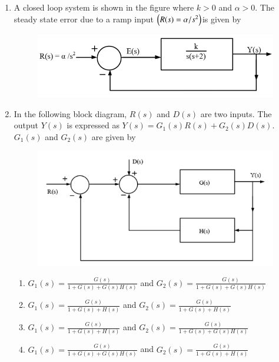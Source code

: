 \documentclass[a4paper, 11pt]{article}
\begin{document}
\begin{enumerate}
    \hfill{}
    
    \item A closed loop system is shown in the figure where $k>0$ and $\alpha>0$. The steady state error due to a ramp input $\left(R(s)=\alpha/s^2\right) $is given by
    \begin{figure}[H]
        \centering
        \includegraphics[width=0.6\columnwidth]{figs/Q31.png}
        \caption*{}
        \label{fig:q41}
    \end{figure}
    \begin{enumerate}
    \end{enumerate}

    \hfill{}
    
    \item In the following block diagram, $R(s)$ and $D(s)$ are two inputs. The output $Y(s)$ is expressed as $Y(s) = G_1(s)R(s) + G_2(s)D(s)$. $G_1(s)$ and $G_2(s)$ are given by
    \begin{figure}[H]
        \centering
        \includegraphics[width=0.6\columnwidth]{figs/Q32.png}
        \caption*{}
        \label{fig:q42}
    \end{figure}
    
    \begin{enumerate}
        \item $G_1(s) = \frac{G(s)}{1+G(s)+G(s)H(s)}$ and $G_2(s) = \frac{G(s)}{1+G(s)+G(s)H(s)}$
        \item $G_1(s) = \frac{G(s)}{1+G(s)+H(s)}$ and $G_2(s) = \frac{G(s)}{1+G(s)+H(s)}$
        \item $G_1(s) = \frac{G(s)}{1+G(s)+H(s)}$ and $G_2(s) = \frac{G(s)}{1+G(s)+G(s)H(s)}$
        \item $G_1(s) = \frac{G(s)}{1+G(s)+G(s)H(s)}$ and $G_2(s) = \frac{G(s)}{1+G(s)+H(s)}$
    \end{enumerate}


\end{enumerate}
\end{document}
